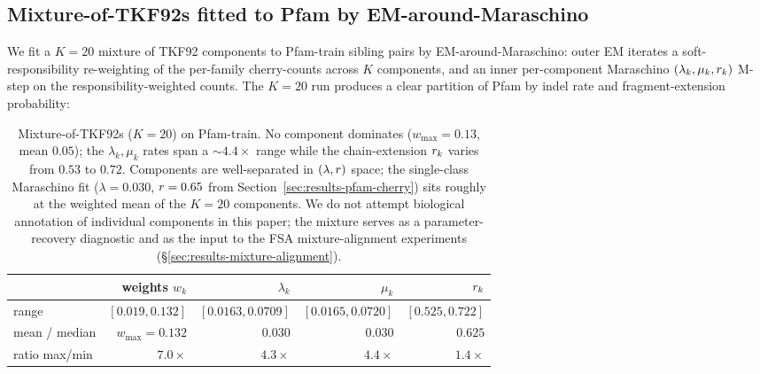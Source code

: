 \subsection{Mixture-of-TKF92s fitted to Pfam by EM-around-Maraschino}
\label{sec:results-mixture-tkf92}


We fit a $K = 20$ mixture of TKF92 components to Pfam-train
sibling pairs by EM-around-Maraschino: outer EM iterates a
soft-responsibility re-weighting of the per-family cherry-counts
across $K$ components, and an inner per-component Maraschino
$(\lambda_k, \mu_k, r_k)$ M-step on the responsibility-weighted
counts.  The $K = 20$ run produces a clear partition of Pfam by
indel rate and fragment-extension probability:

\begin{table}[ht]
\centering\small
\begin{tabular}{lrrrr}
\toprule
& weights $w_k$ & $\lambda_k$ & $\mu_k$ & $r_k$ \\
\midrule
range & $[0.019, 0.132]$ & $[0.0163, 0.0709]$ & $[0.0165, 0.0720]$ & $[0.525, 0.722]$ \\
mean / median  & $w_{\max} = 0.132$ & $0.030$ & $0.030$ & $0.625$ \\
ratio max/min  & $7.0\times$        & $4.3\times$ & $4.4\times$ & $1.4\times$ \\
\bottomrule
\end{tabular}
\caption{Mixture-of-TKF92s ($K = 20$) on Pfam-train.  No
component dominates ($w_{\max} = 0.13$, mean $0.05$); the
$\lambda_k, \mu_k$ rates span a $\sim 4.4\times$ range while
the chain-extension $r_k$ varies from $0.53$ to $0.72$.
Components are well-separated in $(\lambda, r)$ space; the
single-class Maraschino fit ($\lambda = 0.030$, $r = 0.65$
from Section~\ref{sec:results-pfam-cherry}) sits roughly at the
weighted mean of the $K = 20$ components.  We do not attempt
biological annotation of individual components in this paper;
the mixture serves as a parameter-recovery diagnostic and as
the input to the FSA mixture-alignment experiments
(\S\ref{sec:results-mixture-alignment}).}
\label{tab:mixture-tkf92-K20}
\end{table}

